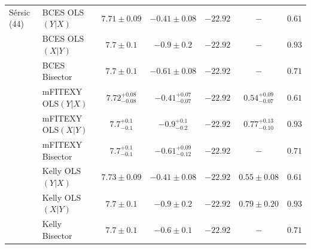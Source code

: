 \documentclass[preprint2]{emulateapj}
\begin{document}
\begin{table}
\begin{tabular}{llccccc}
S\'ersic (44) & BCES OLS$(Y|X)$   & $7.71 \pm 0.09$ & $-0.41 \pm 0.08$ & $-22.92$ & $-$    & $0.61$ \\
              & BCES OLS$(X|Y)$   & $7.7  \pm 0.1$  & $-0.9  \pm 0.2 $ & $-22.92$ & $-$    & $0.93$ \\
              & BCES Bisector     & $7.7  \pm 0.1$  & $-0.61 \pm 0.08$ & $-22.92$ & $-$    & $0.71$ \\
              & mFITEXY OLS$(Y|X)$ & $7.72^{+0.08}_{-0.08}$ & ${-0.41}^{+0.07}_{-0.07}$ & $-22.92$ & $0.54^{+0.09}_{-0.07}$ & $0.61$ \\
              & mFITEXY OLS$(X|Y)$ & $7.7^{+0.1}_{-0.1}$ & $-0.9^{+0.1}_{-0.2}$ & $-22.92$ & $0.77^{+0.13}_{-0.10}$ & $0.93$ \\
              & mFITEXY Bisector   & $7.7^{+0.1}_{-0.1}$ & $-0.61^{+0.09}_{-0.12}$ & $-22.92$ & $-$     & $0.71$ \\
              & Kelly OLS$(Y|X)$  & $7.73 \pm 0.09$ & $-0.41 \pm 0.08$ & $-22.92$ & $0.55 \pm 0.08$ & $0.61$ \\
              & Kelly OLS$(X|Y)$  & $7.7 \pm  0.1$ & $-0.9 \pm 0.2$ & $-22.92$ & $0.79 \pm  0.20$ & $0.93$ \\
              & Kelly Bisector    & $7.7 \pm 0.1$ & $-0.6 \pm 0.1$ & $-22.92$ & $-$    & $0.71$ \\ [0.5em]


\end{tabular}
\end{table}
\end{document}
